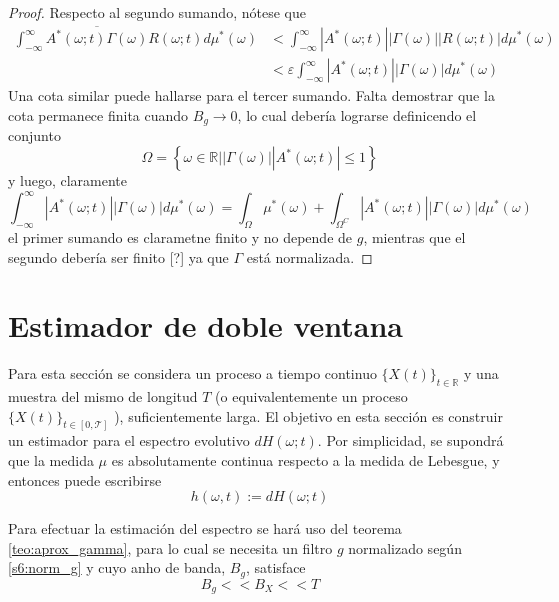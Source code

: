 \documentclass[12pt,letterpaper,draft]{book}
\newcommand{\R}{\mathbb{R}}
\newcommand{\intR}{\int_{-\infty}^{\infty}}
\newcommand{\abso}[1]{\left| #1 \right|}
\newcommand{\xtin}[1]{$\{X(t)\}_{t\in \mathcal{ #1 }}$ }
\begin{document}
\begin{proof}
Respecto al segundo sumando, nótese que 
\begin{align*}
\intR \overline{A^{*}(\omega; t) \Gamma(\omega)} R(\omega; t) d\mu^{*}(\omega)
&< \intR \abso{A^{*}(\omega; t)} \abso{ \Gamma(\omega)} \abso{R(\omega; t)} d\mu^{*}(\omega) \\
&< \varepsilon \intR \abso{A^{*}(\omega; t)}\abso{ \Gamma(\omega)} d\mu^{*}(\omega)
\end{align*}
Una cota similar puede hallarse para el tercer sumando.
Falta demostrar que la cota permanece finita cuando $B_g \rightarrow 0$, lo cual debería lograrse definicendo el conjunto
\begin{equation}
\Omega = \left\{ \omega \in \R | \abso{\Gamma(\omega)} \abso{A^{*}(\omega; t)} \leq 1 \right\} 
\end{equation}
y luego, claramente
\begin{equation}
\intR \abso{A^{*}(\omega; t)}\abso{ \Gamma(\omega)} d\mu^{*}(\omega) = 
\int_\Omega \mu^{*}(\omega) + 
\int_{\Omega^{C}} \abso{A^{*}(\omega; t)}\abso{ \Gamma(\omega)} d\mu^{*}(\omega)
\end{equation}
el primer sumando es clarametne finito y no depende de $g$, mientras que el segundo debería ser finito [?] ya que $\Gamma$ está normalizada.
\end{proof}


\section{Estimador de doble ventana}
\label{sec:doble_ventana}

Para esta sección se considera un proceso a tiempo continuo \xtin{\R} y una muestra del mismo de longitud $T$ (o equivalentemente un proceso \xtin{[0,T]}), suficientemente larga. El objetivo en esta sección es construir un estimador para el espectro evolutivo $dH(\omega; t)$.
%
Por simplicidad, se supondrá que la medida $\mu$ es absolutamente continua respecto a la medida de Lebesgue, y entonces puede escribirse
\begin{equation}
h(\omega,t) := dH(\omega; t)
\end{equation}

Para efectuar la estimación del espectro se hará uso del teorema \ref{teo:aprox_gamma}, para lo cual se necesita un filtro $g$ normalizado según \ref{s6:norm_g} y cuyo anho de banda, $B_g$, satisface
\begin{equation}
B_g << B_X << T
\label{s6:anchos_banda}
\end{equation}
\end{document}
